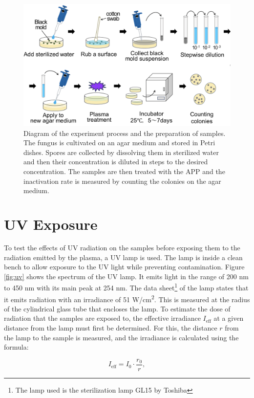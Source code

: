 \begin{figure}
    \centering
    \includegraphics[width=1\textwidth]{images/Process.png}
    \caption[Diagram of the experiment process]{Diagram of the experiment process and the preparation of samples. The fungus is cultivated on an agar medium and stored in Petri dishes. Spores are collected by dissolving them in sterilized water and then their concentration is diluted in steps to the desired concentration. The samples are then treated with the APP and the inactivation rate is measured by counting the colonies on the agar medium.}
    \label{fig:process}
\end{figure}

\section{UV Exposure}
To test the effects of UV radiation on the samples before exposing them to the radiation emitted by the plasma, a UV lamp is used. The lamp is inside a clean bench to allow exposure to the UV light while preventing contamination. Figure \ref{fig:uv} shows the spectrum of the UV lamp. It emits light in the range of 200 nm to 450 nm with its main peak at 254 nm. The data sheet\footnote{The lamp used is the sterilization lamp \textsc{GL15} by Toshiba} of the lamp states that it emits radiation with an irradiance of 51 \textmu W/cm\textsuperscript{2}. This is measured at the radius of the cylindrical glass tube that encloses the lamp. To estimate the dose of radiation that the samples are exposed to, the effective irradiance $I_\text{eff}$ at a given distance from the lamp must first be determined. For this, the distance $r$ from the lamp to the sample is measured, and the irradiance is calculated using the formula:

\begin{equation}
I_\text{eff} = I_0 \cdot \frac{r_0}{r},
\end{equation}


